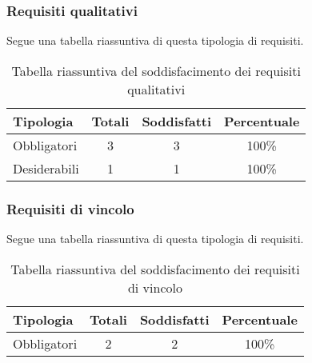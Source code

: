 \subsubsection{Requisiti qualitativi}
Segue una tabella riassuntiva di questa tipologia di requisiti.
\begin{table}[H]
	\begin{center}
	  \begin{tabular}{ l  c  c  c }
	    \hline
	    \textbf{Tipologia} & \textbf{Totali} & \textbf{Soddisfatti} & \textbf{Percentuale} \\ \hline
	    Obbligatori & 3 & 3 & 100\%\\ \hline
	    Desiderabili & 1 & 1 & 100\%\\
	    \hline
	  \end{tabular}
	\end{center}
	\caption{Tabella riassuntiva del soddisfacimento dei requisiti qualitativi}
\end{table}

\subsubsection{Requisiti di vincolo}
Segue una tabella riassuntiva di questa tipologia di requisiti.
\begin{table}[H]
	\begin{center}
	  \begin{tabular}{ l  c  c  c }
	    \hline
	    \textbf{Tipologia} & \textbf{Totali} & \textbf{Soddisfatti} & \textbf{Percentuale} \\ \hline
	    Obbligatori & 2 & 2 & 100\%\\
	    \hline
	  \end{tabular}
	\end{center}
\caption{Tabella riassuntiva del soddisfacimento dei requisiti di vincolo}
\end{table}	

